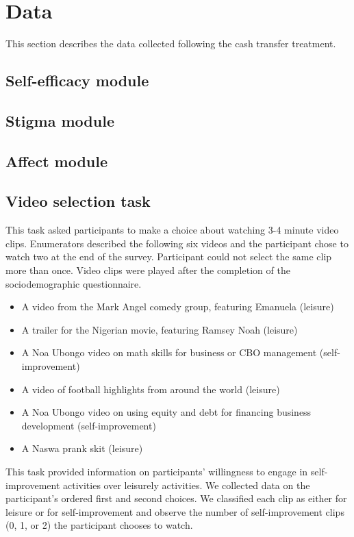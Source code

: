 \documentclass[11pt, a4paper]{article}\usepackage[]{graphicx}\usepackage[]{color}
\begin{document}
\section{Data}

    This section describes the data collected following the cash transfer treatment.

    \subsection{Self-efficacy module}
    \subsection{Stigma module}
    \subsection{Affect module}
    \subsection{Video selection task}

        This task asked participants to make a choice about watching 3-4 minute video clips. Enumerators described the following six videos and the participant chose to watch two at the end of the survey. Participant could not select the same clip more than once. Video clips were played after the completion of the sociodemographic questionnaire.

        \begin{itemize}
        \itemsep0em 
            \item A video from the Mark Angel comedy group, featuring Emanuela (leisure)
            \item A trailer for the Nigerian movie, featuring Ramsey Noah (leisure)
            \item A Noa Ubongo video on math skills for business or CBO management (self-improvement)
            \item A video of football highlights from around the world (leisure)
            \item A Noa Ubongo video on using equity and debt for financing business development (self-improvement)
            \item A Naswa prank skit (leisure)
        \end{itemize}

        This task provided information on participants' willingness to engage in self-improvement activities over leisurely activities. We collected data on the participant's ordered first and second choices. We classified each clip as either for leisure or for self-improvement and observe the number of self-improvement clips (0, 1, or 2) the participant chooses to watch.
\end{document}
